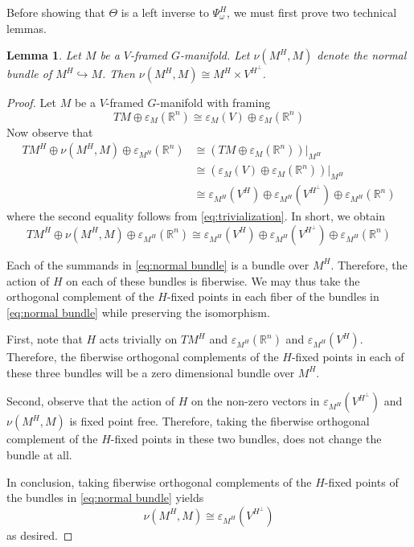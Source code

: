 \documentclass[11pt]{amsart}
\newcommand{\R}{\mathbb R}
\theoremstyle{plain}   %
\newtheorem{lem}[thm]{Lemma}
\theoremstyle{definition}
\theoremstyle{remark}
\numberwithin{equation}{section}
\begin{document}
Before showing that $\Theta$ is a left inverse to $\Psi_\omega^H$, we must first prove two technical lemmas. 

\begin{lem}\label{lem:tubular nbhd}
Let $M$ be a $V$-framed $G$-manifold. Let $\nu(M^H,M)$ denote the normal bundle of $M^H\hookrightarrow M$. Then $\nu(M^H,M)\cong M^H\times V^{H^\perp}$.
\end{lem}

\begin{proof}
Let $M$ be a $V$-framed $G$-manifold with framing
\begin{equation}\label{eq:trivialization}
TM\oplus\varepsilon_M(\R^n)\cong \varepsilon_M(V)\oplus\varepsilon_M(\R^n)
\end{equation}
Now observe that 
\begin{align*}
TM^H\oplus \nu(M^H,M)\oplus \varepsilon_{M^H}(\R^n)
& \cong (TM\oplus\varepsilon_M(\R^n))|_{M^H}\\
& \cong (\varepsilon_M(V)\oplus\varepsilon_M(\R^n))|_{M^H}\\
& \cong \varepsilon_{M^H}(V^H)\oplus \varepsilon_{M^H}(V^{H^\perp})\oplus\varepsilon_{M^H}(\R^n)
\end{align*}
where the second equality follows from \cref{eq:trivialization}. In short, we obtain
\begin{equation}\label{eq:normal bundle}
TM^H\oplus \nu(M^H,M)\oplus \varepsilon_{M^H}(\R^n) \cong \varepsilon_{M^H}(V^H)\oplus \varepsilon_{M^H}(V^{H^\perp})\oplus\varepsilon_{M^H}(\R^n)
\end{equation}

Each of the summands in \cref{eq:normal bundle} is a bundle over $M^H$. Therefore, the action of $H$ on each of these bundles is fiberwise. We may thus take the orthogonal complement of the $H$-fixed points in each fiber of the bundles in \cref{eq:normal bundle} while preserving the isomorphism. 

First, note that $H$ acts trivially on $TM^H$ and $\varepsilon_{M^H}(\R^n)$ and $\varepsilon_{M^H}(V^H)$. Therefore, the fiberwise orthogonal complements of the $H$-fixed points in each of these three bundles will be a zero dimensional bundle over $M^H$. 

Second, observe that the action of $H$ on the non-zero vectors in $\varepsilon_{M^H}(V^{H^\perp})$ and $\nu(M^H,M)$ is fixed point free. Therefore, taking the fiberwise orthogonal complement of the $H$-fixed points in these two bundles, does not change the bundle at all. 

In conclusion, taking fiberwise orthogonal complements of the $H$-fixed points of the bundles in \cref{eq:normal bundle} yields
\[
\nu(M^H,M)\cong \varepsilon_{M^H}(V^{H^\perp})
\]
as desired. 
\end{proof}
\end{document}
